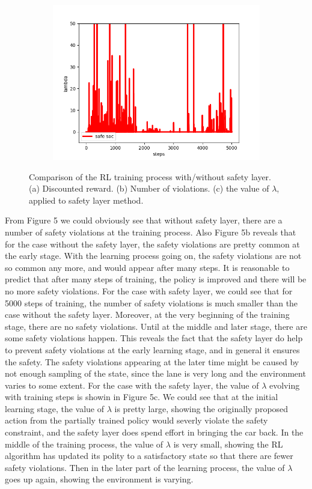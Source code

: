 \documentclass{article} %
\begin{document}
\begin{figure}[ht]
\begin{subfigure}[b]{0.45\textwidth}
\centering
\includegraphics[width=\textwidth]{fig5c_lambda.png}
\caption{}
\label{fig:gull}
\end{subfigure}%
\caption{Comparison of the RL training process with/without safety layer. (a) Discounted reward. (b) Number of violations. (c) the value of $\lambda$, applied to safety layer method.}
\end{figure}
 
From Figure 5 we could obviously see that without safety layer, there are a number of safety violations at the training process. Also Figure 5b reveals that for the case without the safety layer, the safety violations are pretty common at the early stage. With the learning process going on, the safety violations are not so common any more, and would appear after many steps. It is reasonable to predict that after many steps of training, the policy is improved and there will be no more safety violations. For the case with safety layer, we could see that for 5000 steps of training, the number of safety violations is much smaller than the case without the safety layer. Moreover, at the very beginning of the training stage, there are no safety violations. Until at the middle and later stage, there are some safety violations happen. This reveals the fact that the safety layer do help to prevent safety violations at the early learning stage, and in general it ensures the safety. The safety violations appearing at the later time might be caused by not enough sampling of the state, since the lane is very long and the environment varies to some extent. For the case with the safety layer, the value of $\lambda$ evolving with training steps is showin in Figure 5c. We could see that at the initial learning stage, the value of $\lambda$ is pretty large, showing the originally proposed action from the partially trained policy would severly violate the safety constraint, and the safety layer does spend effort in bringing the car back. In the middle of the training process, the value of $\lambda$ is very small, showing the RL algorithm has updated its polity to a satisfactory state so that there are fewer safety violations. Then in the later part of the learning process, the value of $\lambda$ goes up again, showing the environment is varying.
\end{document}
